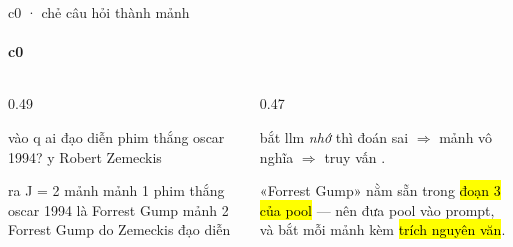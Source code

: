 \begin{frame}[fragile]{c0 · chẻ câu hỏi thành mảnh}
  \framesubtitle{c0}

  \begin{columns}[t]
  \begin{column}{0.49\textwidth}
    \begin{bx}[title={vào là $q$ \emph{và} $y$ — ra là $J$ mệnh đề}]
      \begin{dia}
vào   q  ai đạo diễn phim thắng oscar 1994?
      y  Robert Zemeckis

ra    J = 2 mảnh
  mảnh 1  phim thắng oscar 1994 là
          Forrest Gump
  mảnh 2  Forrest Gump do Zemeckis
          đạo diễn
      \end{dia}
    \end{bx}
  \end{column}
  \begin{column}{0.47\textwidth}
    \begin{badb}[title={chỗ dễ hỏng: thực thể bắc cầu}]
       bắt llm \emph{nhớ} thì
      đoán sai $\Rightarrow$ mảnh vô nghĩa $\Rightarrow$ truy vấn
      .
    \end{badb}
    \begin{keyb}[title={chữa: cho llm \emph{đọc} thay vì \emph{nhớ}}]
      «Forrest Gump» nằm sẵn trong \hl{đoạn 3 của pool} — nên đưa pool vào prompt,
      và bắt mỗi mảnh kèm \hl{trích nguyên văn}.
      \vspace{0.25em}

    \end{keyb}
  \end{column}
  \end{columns}
\end{frame}

